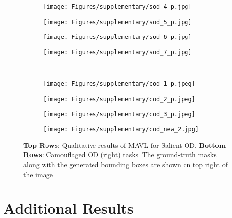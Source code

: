 \documentclass[runningheads]{llncs}
\begin{document}
\begin{figure*}[!ht]
  \centering
  \begin{subfigure}{.24\columnwidth}
    \centering
    \texttt{[image: Figures/supplementary/sod\_4\_p.jpg]}
  \end{subfigure}\begin{subfigure}{.24\columnwidth}
    \centering
    \texttt{[image: Figures/supplementary/sod\_5\_p.jpg]}
  \end{subfigure}
  \begin{subfigure}{.24\columnwidth}
    \centering
    \texttt{[image: Figures/supplementary/sod\_6\_p.jpg]}
  \end{subfigure}\begin{subfigure}{.24\columnwidth}
    \centering
    \texttt{[image: Figures/supplementary/sod\_7\_p.jpg]}
  \end{subfigure}\\
  \begin{subfigure}{.24\columnwidth}
    \centering
    \texttt{[image: Figures/supplementary/cod\_1\_p.jpeg]}
  \end{subfigure}\begin{subfigure}{.24\columnwidth}
    \centering
    \texttt{[image: Figures/supplementary/cod\_2\_p.jpeg]}
  \end{subfigure}
  \begin{subfigure}{.24\columnwidth}
    \centering
    \texttt{[image: Figures/supplementary/cod\_3\_p.jpeg]}
  \end{subfigure}\begin{subfigure}{.24\columnwidth}
    \centering
    \texttt{[image: Figures/supplementary/cod\_new\_2.jpg]}
  \end{subfigure}\caption{\textbf{Top Rows}: Qualitative results of MAVL for Salient OD. \textbf{Bottom Rows}: Camouflaged OD (right) tasks. The ground-truth masks along with the generated  bounding boxes are shown on top right of the image}
  \label{figure:sod-cod}
\end{figure*}

\section{Additional Results}\label{app:add_results}
\end{document}
